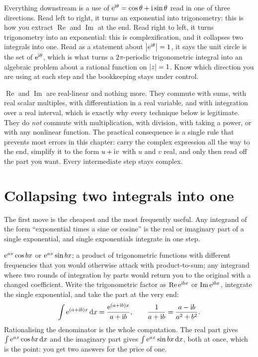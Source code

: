 \begin{keynote}
Everything downstream is a use of $\mathrm{e}^{\mathrm{i}\theta}=\cos\theta+\mathrm{i}\sin\theta$ read in one of three directions. Read left to right, it turns an exponential into trigonometry: this is how you extract $\operatorname{Re}$ and $\operatorname{Im}$ at the end. Read right to left, it turns trigonometry into an exponential: this is complexification, and it collapses two integrals into one. Read as a statement about $\left\lvert \mathrm{e}^{\mathrm{i}\theta}\right\rvert=1$, it says the unit circle is the set of $\mathrm{e}^{\mathrm{i}\theta}$, which is what turns a $2\pi$-periodic trigonometric integral into an algebraic problem about a rational function on $\left\lvert z\right\rvert=1$. Know which direction you are using at each step and the bookkeeping stays under control.
\end{keynote}

\begin{keynote}
$\operatorname{Re}$ and $\operatorname{Im}$ are real-linear and nothing more. They commute with sums, with real scalar multiples, with differentiation in a real variable, and with integration over a real interval, which is exactly why every technique below is legitimate. They do \emph{not} commute with multiplication, with division, with taking a power, or with any nonlinear function. The practical consequence is a single rule that prevents most errors in this chapter: carry the complex expression all the way to the end, simplify it to the form $u+\mathrm{i} v$ with $u$ and $v$ real, and only then read off the part you want. Every intermediate step stays complex.
\end{keynote}

\section{Collapsing two integrals into one}

The first move is the cheapest and the most frequently useful. Any integrand of the form ``exponential times a sine or cosine'' is the real or imaginary part of a single exponential, and single exponentials integrate in one step.

\cue $\mathrm{e}^{ax}\cos bx$ or $\mathrm{e}^{ax}\sin bx$; a product of trigonometric functions with different frequencies that you would otherwise attack with product-to-sum; any integrand where two rounds of integration by parts would return you to the original with a changed coefficient.
\method Write the trigonometric factor as $\operatorname{Re}\mathrm{e}^{\mathrm{i} bx}$ or $\operatorname{Im}\mathrm{e}^{\mathrm{i} bx}$, integrate the single exponential, and take the part at the very end:
\[\int\mathrm{e}^{(a+\mathrm{i} b)x}\,\mathrm{d} x=\frac{\mathrm{e}^{(a+\mathrm{i} b)x}}{a+\mathrm{i} b},\qquad \frac{1}{a+\mathrm{i} b}=\frac{a-\mathrm{i} b}{a^{2}+b^{2}}.\]
Rationalising the denominator is the whole computation. The real part gives $\int\mathrm{e}^{ax}\cos bx\,\mathrm{d} x$ and the imaginary part gives $\int\mathrm{e}^{ax}\sin bx\,\mathrm{d} x$, both at once, which is the point: you get two answers for the price of one.

